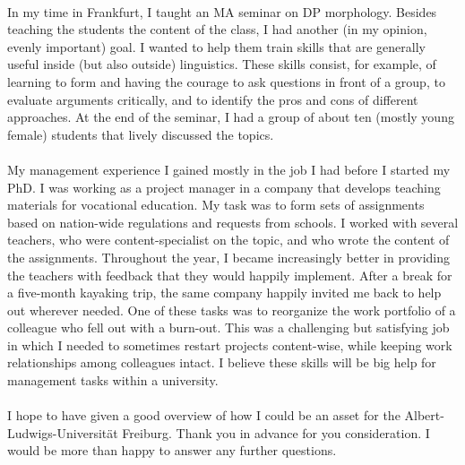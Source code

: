 \documentclass[12pt]{article}
\begin{document}
\phantom{x}\\

In my time in Frankfurt, I taught an MA seminar on DP morphology. Besides teaching the students the content of the class, I had another (in my opinion, evenly important) goal. I wanted to help them train skills that are generally useful inside (but also outside) linguistics. These skills consist, for example, of learning to form and having the courage to ask questions in front of a group, to evaluate arguments critically, and to identify the pros and cons of different approaches. At the end of the seminar, I had a group of about ten (mostly young female) students that lively discussed the topics.
\\%

\phantom{x}\\

My management experience I gained mostly in the job I had before I started my PhD. I was working as a project manager in a company that develops teaching materials for vocational education. My task was to form sets of assignments based on nation-wide regulations and requests from schools. I worked with several teachers, who were content-specialist on the topic, and who wrote the content of the assignments. Throughout the year, I became increasingly better in providing the teachers with feedback that they would happily implement. After a break for a five-month kayaking trip, the same company happily invited me back to help out wherever needed. One of these tasks was to reorganize the work portfolio of a colleague who fell out with a burn-out. This was a challenging but satisfying job in which I needed to sometimes restart projects content-wise, while keeping work relationships among colleagues intact. I believe these skills will be big help for management tasks within a university.\\

\phantom{x}\\

I hope to have given a good overview of how I could be an asset for the Albert-Ludwigs-Universität Freiburg. Thank you in advance for you consideration. I would be more than happy to answer any further questions.\\

\phantom{x}\\
\end{document}
